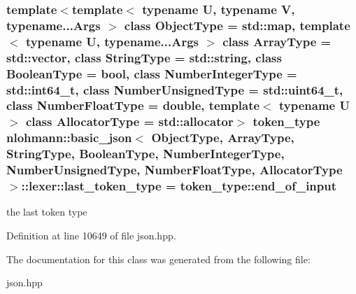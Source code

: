 \subsubsection[{last\+\_\+token\+\_\+type}]{\setlength{\rightskip}{0pt plus 5cm}template$<$template$<$ typename U, typename V, typename...\+Args $>$ class Object\+Type = std\+::map, template$<$ typename U, typename...\+Args $>$ class Array\+Type = std\+::vector, class String\+Type  = std\+::string, class Boolean\+Type  = bool, class Number\+Integer\+Type  = std\+::int64\+\_\+t, class Number\+Unsigned\+Type  = std\+::uint64\+\_\+t, class Number\+Float\+Type  = double, template$<$ typename U $>$ class Allocator\+Type = std\+::allocator$>$ {\bf token\+\_\+type} {\bf nlohmann\+::basic\+\_\+json}$<$ Object\+Type, Array\+Type, String\+Type, Boolean\+Type, Number\+Integer\+Type, Number\+Unsigned\+Type, Number\+Float\+Type, Allocator\+Type $>$\+::lexer\+::last\+\_\+token\+\_\+type = {\bf token\+\_\+type\+::end\+\_\+of\+\_\+input}\hspace{0.3cm}{\ttfamily [private]}}\label{classnlohmann_1_1basic__json_1_1lexer_a1593a0456753134a4a558bb55cc21125}


the last token type 



Definition at line 10649 of file json.\+hpp.



The documentation for this class was generated from the following file\+:\begin{DoxyCompactItemize}
\item 
json.\+hpp\end{DoxyCompactItemize}
